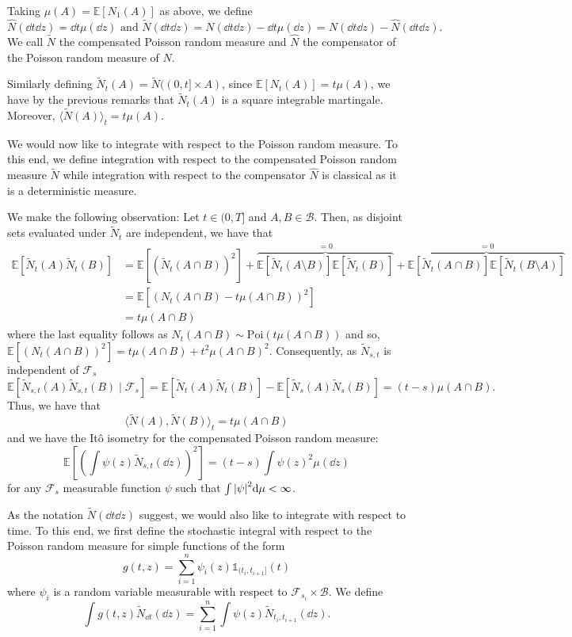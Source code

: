 \documentclass[]{article}
\theoremstyle{definition}
\theoremstyle{definition}
\begin{document}
Taking \(\mu(A) = \mathbb{E}[N_1(A)]\) as above, we define 
\[\hat N(\dd t \dd z) = \dd t \mu(\dd z) \text{ and } 
  \tilde N(\dd t \dd z) = N(\dd t \dd z) - \dd t \mu(\dd z) = N(\dd t \dd z) - \hat N(\dd t \dd z).\]
We call \(\tilde N\) the compensated Poisson random measure and \(\hat N\) the compensator of 
the Poisson random measure of \(N\).

Similarly defining \(\tilde N_t(A) = \tilde N((0, t] \times A)\), since \(\mathbb{E}[N_t(A)] = t\mu(A)\),
we have by the previous remarks that \(\tilde N_t(A)\) is a square integrable martingale. Moreover, 
\(\langle \tilde N(A)\rangle_t = t \mu(A)\). 

We would now like to integrate with respect to the Poisson random measure. To this end, we define 
integration with respect to the compensated Poisson random measure \(\tilde N\) while integration 
with respect to the compensator \(\hat N\) is classical as it is a deterministic measure.

We make the following observation: Let \(t \in (0, T]\) and \(A, B \in \mathcal{B}\). Then, as 
disjoint sets evaluated under \(\tilde N_t\) are independent, we have that 
\begin{align*}
  \mathbb{E}[\tilde N_t(A) \tilde N_t(B)] 
  & = \mathbb{E}[(\tilde N_t(A \cap B))^2] 
    + \overbrace{\mathbb{E}[\tilde N_t(A \setminus B)]\mathbb{E}[\tilde N_t(B)]}^{= 0}
    + \overbrace{\mathbb{E}[\tilde N_t(A \cap B)]\mathbb{E}[\tilde N_t(B \setminus A)]}^{= 0}\\
  & = \mathbb{E}[(N_t(A \cap B) - t\mu(A \cap B))^2]\\
  & = t\mu(A \cap B)
\end{align*}
where the last equality follows as \(N_t(A \cap B) \sim \text{Poi}(t\mu(A \cap B))\) and so, 
\(\mathbb{E}[(N_t(A \cap B))^2] = t\mu(A \cap B) + t^2 \mu(A \cap B)^2\). Consequently, as 
\(\tilde N_{s, t}\) is independent of \(\mathcal{F}_s\)
\[\mathbb{E}[\tilde N_{s, t}(A) \tilde N_{s, t}(B) \mid \mathcal{F}_s] = 
  \mathbb{E}[\tilde N_t(A) \tilde N_t(B)] - \mathbb{E}[\tilde N_s(A) \tilde N_s(B)]
  = (t - s)\mu(A \cap B).\]
Thus, we have that 
\[\langle \tilde N(A), \tilde N(B)\rangle_t = t \mu(A \cap B)\]
and we have the It\^o isometry for the compensated Poisson random measure:
\[\mathbb{E}\left[\left(\int \psi(z) \tilde N_{s, t}(\dd z)\right)^2\right] 
  = (t - s) \int \psi(z)^2 \mu(\dd z)\]
for any \(\mathcal{F}_s\) measurable function \(\psi\) such that \(\int \abs{\psi}^2 \dd\mu < \infty\).

As the notation \(\tilde N(\dd t \dd z)\) suggest, we would also like to integrate with respect to time.
To this end, we first define the stochastic integral with respect to the Poisson random measure for 
simple functions of the form 
\[g(t, z) = \sum_{i = 1}^n \psi_i(z) \mathbb{1}_{(t_i, t_{i + 1}]}(t)\]
where \(\psi_i\) is a random variable measurable with respect to \(\mathcal{F}_{s_i} \times \mathcal{B}\). We define
\[\int g(t, z) \tilde N_{\dd t}(\dd z) = \sum_{i = 1}^n \int \psi(z) \tilde N_{t_i, t_{i + 1}}(\dd z).\]
\end{document}
